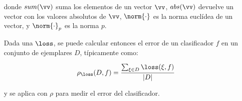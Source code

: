 donde $sum(\vv)$ suma los elementos de un vector $\vv$, $abs(\vv)$ devuelve un vector con los valores absolutos de $\vv$,  $\norm{\cdot}$ es la norma euclídea de un vector, y $\norm{\cdot}_p$ es la norma $p$.

Dada una $\loss$, se puede calcular entonces el error de un clasificador $f$ en un conjunto de ejemplares $D$, típicamente como:

\begin{equation}
\rho_{\loss}(D,f) = \frac{\sum_{\xi \in D} \loss(\xi,f)}{|D|}
\end{equation}

y se aplica \cv con $\rho$ para medir el error del clasificador.
